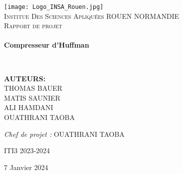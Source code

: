 \begin{titlepage}
  \begin{center}

    \texttt{[image: Logo\_INSA\_Rouen.jpg]}~\\[1.5cm]

    \textsc{\LARGE Institue Des Sciences Apliquées ROUEN NORMANDIE}\\[2cm]

    \textsc{\Large Rapport de projet}\\[2cm]

    \HRule \\[0.4cm]
    {\huge\bfseries Compresseur d'Huffman\\[0.4cm] }

    \HRule \\[2cm]
    
   

    \begin{minipage}{0.4\textwidth}
      \begin{flushleft} \large
       \textbf{AUTEURS:}\\
    \textsc{THOMAS BAUER\\
    MATIS SAUNIER\\
    ALI HAMDANI\\
    OUATHRANI TAOBA}\\
      
       
      \end{flushleft}
    \end{minipage}
    \begin{minipage}{0.4\textwidth}
      \begin{flushright} \large
        \emph{Chef de projet : } OUATHRANI TAOBA 
      \end{flushright}
    \end{minipage}
  
  \begin{center}
    ITI3 2023-2024
  \end{center}
    
    \vfill
 
 {\large 7 Janvier 2024}


  \end{center}
\end{titlepage}



    